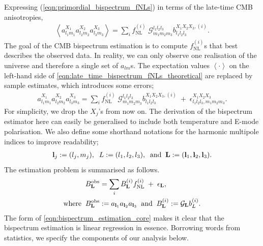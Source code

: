 Expressing (\ref{eqn:primordial_bispectrum_fNLs}) in terms of the late-time CMB anisotropies,
\begin{align}
	\left< a_{l_1 m_1}^{X_1} a_{l_2 m_2}^{X_2} a_{l_3 m_3}^{X_3}  \right> = \sum_i f^{(i)}_\text{NL} \; \mathcal{G}^{l_1 l_2 l_3}_{m_1 m_2 m_3} b^{X_1 X_2 X_3, (i)}_{l_1 l_2 l_3}. \label{eqn:late_time_bispectrum_fNLs_theoretical}
\end{align}
The goal of the CMB bispectrum estimation is to compute $f^{(i)}_\text{NL}$s that best describes the observed data. In reality, we can only observe one realisation of the universe and therefore a single set of $a_{lm}$s. The expectation values $\left< \cdot \right>$ on the left-hand side of \eqref{eqn:late_time_bispectrum_fNLs_theoretical} are replaced by sample estimates, which introduces some errors;
\begin{align}
	a_{l_1 m_1}^{X_1} a_{l_2 m_2}^{X_2} a_{l_3 m_3}^{X_3} = \sum_i  f^{(i)}_\text{NL} \; \mathcal{G}^{l_1 l_2 l_3}_{m_1 m_2 m_3} b^{X_1 X_2 X_3, (i)}_{l_1 l_2 l_3} \;+\; \epsilon^{X_1 X_2 X_3}_{l_1 l_2 l_3, m_1 m_2 m_3}. \label{eqn:late_time_bispectrum_fNLs_sample}
\end{align}
For simplicity, we drop the $X_j$'s from now on. The derivation of the bispectrum estimator here can easily be generalised to include both temperature and E-mode polarisation. We also define some shorthand notations for the harmonic multipole indices to improve readability;
\begin{align}
	\mathbf{l}_j:=(l_j,m_j), \;\; L:=(l_1,l_2,l_3), \;\; \text{and} \;\; \mathbf{L}:=(\mathbf{l}_1, \mathbf{l}_2, \mathbf{l}_3).
\end{align}
The estimation problem is summarised as follows.
\begin{align}
	&B^\text{obs}_\mathbf{L} = \sum_i B^{(i)}_\mathbf{L} f^{(i)}_\text{NL}  \;+\; \epsilon_\mathbf{L}, \label{eqn:bispectrum_estimation_core}\\
	\text{where} \;\; &B^\text{obs}_\mathbf{L} := a_{\mathbf{l}_1} a_{\mathbf{l}_2} a_{\mathbf{l}_3} \;\; \text{and} \;\; B^{(i)}_\mathbf{L} := \mathcal{G}_\mathbf{L} b^{(i)}_L.
\end{align}
The form of \eqref{eqn:bispectrum_estimation_core} makes it clear that the bispectrum estimation is linear regression in essence. Borrowing words from statistics, we specify the components of our analysis below.
